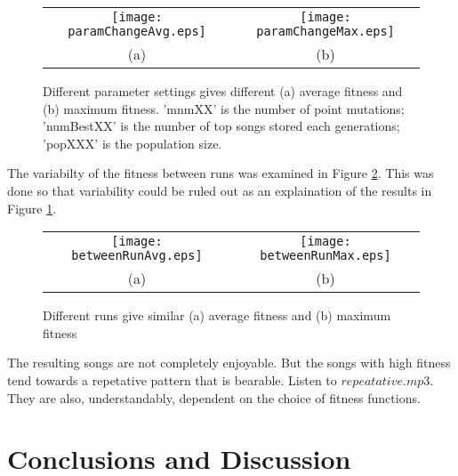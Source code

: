 \documentclass{article}
\begin{document}
\begin{figure}[h]
    \begin{center}
        \begin{tabular}{c c}
        \texttt{[image: paramChangeAvg.eps]} &
        \texttt{[image: paramChangeMax.eps]} \\
        (a) & (b) 
        \end{tabular}
        \caption{Different parameter settings gives different (a) average fitness and (b) maximum fitness. 'mnmXX' is the number of point mutations; 'numBestXX' is the number of top songs stored each generations; 'popXXX' is the population size.}
        \label{fig:paramChange}
    \end{center}
\end{figure}

The variabilty of the fitness between runs was examined in Figure \ref{fig:betweenRuns}. This was done so that variability could be ruled out as an explaination of the results in Figure \ref{fig:paramChange}.

\begin{figure}[h]
    \begin{center}
        \begin{tabular}{c c}
        \texttt{[image: betweenRunAvg.eps]} &
        \texttt{[image: betweenRunMax.eps]} \\
        (a) & (b) 
        \end{tabular}
        \caption{Different runs give similar (a) average fitness and (b) maximum fitness}
        \label{fig:betweenRuns}
    \end{center}
\end{figure}

The resulting songs are not completely enjoyable. But the songs with high fitness tend towards a repetative pattern that is bearable. Listen to $repeatative.mp3$. They are also, understandably, dependent on the choice of fitness functions.



\section*{Conclusions and Discussion}
\end{document}
